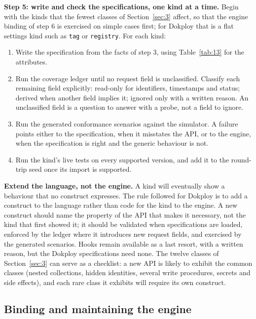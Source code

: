 \textbf{Step 5: write and check the specifications, one kind at a time.} Begin with the kinds that the
fewest classes of Section~\ref{sec:3} affect, so that the engine binding of step 6 is exercised on simple cases
first; for Dokploy that is a flat settings kind such as \texttt{tag} or \texttt{registry}. For each kind:

\begin{enumerate}
\def\labelenumi{\arabic{enumi}.}
\item
  Write the specification from the facts of step 3, using Table~\ref{tab:13} for the attributes.
\item
  Run the coverage ledger until no request field is unclassified. Classify each remaining field
  explicitly: read-only for identifiers, timestamps and status; derived when another field implies
  it; ignored only with a written reason. An unclassified field is a question to answer with a probe,
  not a field to ignore.
\item
  Run the generated conformance scenarios against the simulator. A failure points either to the
  specification, when it misstates the API, or to the engine, when the specification is right and
  the generic behaviour is not.
\item
  Run the kind's live tests on every supported version, and add it to the round-trip seed once its
  import is supported.
\end{enumerate}

\textbf{Extend the language, not the engine.} A kind will eventually show a behaviour that no construct
expresses. The rule followed for Dokploy is to add a construct to the language rather than code for
the kind to the engine. A new construct should name the property of the API that makes it necessary,
not the kind that first showed it; it should be validated when specifications are loaded, enforced by
the ledger where it introduces new request fields, and exercised by the generated scenarios. Hooks
remain available as a last resort, with a written reason, but the Dokploy specifications need none.
The twelve classes of Section~\ref{sec:3} can serve as a checklist: a new API is likely to exhibit the common
classes (nested collections, hidden identities, several write procedures, secrets and side effects),
and each rare class it exhibits will require its own construct.

\subsection{Binding and maintaining the engine}\label{sec:8.3}

